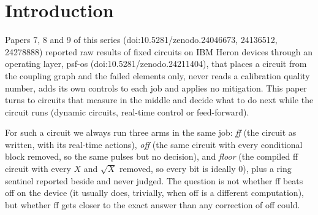 \documentclass[10pt,a4paper]{article}
\begin{document}
\begin{abstract}
0.020), as on 11-18. Two more tests inside one item cost nothing measurable when they did not fire (repetition code),
though the code decoded in real time stayed below its ceiling (0.812 against 0.875). Phase estimation crossed its
ceiling again at $n = 2, 3, 4$ on one device and night, and, as a separate yardstick, was right per shot more often than
the textbook circuit by $+0.03$, $+0.07$, $+0.17$. The loop, run from the package, refused the previous night's ledger
after a recalibration, stopped spending where its prescription never helped, added one try where it did, and reached a
fixed point. What the device keeps of the noiseless
value varies by night (0.61--0.87 for the same balanced pair on two nights); no quantum advantage is claimed.
\end{abstract}

\section{Introduction}\label{sec:intro}
Papers 7, 8 and 9 of this series (doi:10.5281/zenodo.24046673, 24136512, 24278888) reported raw results of fixed
circuits on IBM Heron devices through an operating layer, psf-os (doi:10.5281/zenodo.24211404), that places a circuit
from the coupling graph and the failed elements only, never reads a calibration quality number, adds its own controls to
each job and applies no mitigation. This paper turns to circuits that measure in the middle and decide what to do next
while the circuit runs (dynamic circuits, real-time control or feed-forward).

For such a circuit we always run three arms in the same job: \emph{ff} (the circuit as written, with its real-time
actions), \emph{off} (the same circuit with every conditional block removed, so the same pulses but no decision), and
\emph{floor} (the compiled ff circuit with every $X$ and $\sqrt X$ removed, so every bit is ideally 0), plus a ring
sentinel reported beside and never judged. The question is not whether ff beats off on the device (it usually does,
trivially, when off is a different computation), but whether ff gets closer to the exact answer than any correction of
off could.
\end{document}

